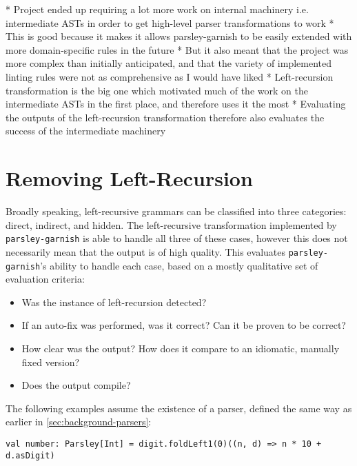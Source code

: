 \documentclass[../../main.tex]{subfiles}
\begin{document}
\label{sec:evaluation}

* Project ended up requiring a lot more work on internal machinery i.e. intermediate ASTs in order to get high-level parser transformations to work
* This is good because it makes it allows parsley-garnish to be easily extended with more domain-specific rules in the future
* But it also meant that the project was more complex than initially anticipated, and that the variety of implemented linting rules were not as comprehensive as I would have liked
* Left-recursion transformation is the big one which motivated much of the work on the intermediate ASTs in the first place, and therefore uses it the most
* Evaluating the outputs of the left-recursion transformation therefore also evaluates the success of the intermediate machinery

\section{Removing Left-Recursion}\label{sec:eval-leftrec}
Broadly speaking, left-recursive grammars can be classified into three categories: direct, indirect, and hidden.
The left-recursive transformation implemented by \texttt{parsley-garnish} is able to handle all three of these cases, however this does not necessarily mean that the output is of high quality.
This  evaluates \texttt{parsley-garnish}'s ability to handle each case, based on a mostly qualitative set of evaluation criteria:
\begin{itemize}
  \item Was the instance of left-recursion detected?
  \item If an auto-fix was performed, was it correct? Can it be proven to be correct?
  \item How clear was the output? How does it compare to an idiomatic, manually fixed version?
  \item Does the output compile?
\end{itemize}
%
The following examples assume the existence of a  parser, defined the same way as earlier in \cref{sec:background-parsers}:
\begin{verbatim}
val number: Parsley[Int] = digit.foldLeft1(0)((n, d) => n * 10 + d.asDigit)
\end{verbatim}
\end{document}
